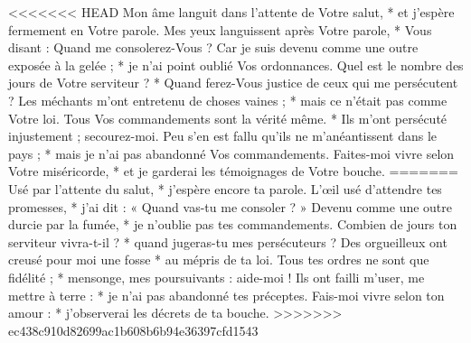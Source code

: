 <<<<<<< HEAD
Mon âme languit dans l'attente de Votre salut, * et j'espère fermement en Votre parole.
\versseparator
Mes yeux languissent après Votre parole, * Vous disant : Quand me consolerez-Vous ?
\versseparator
Car je suis devenu comme une outre exposée à la gelée ; * je n'ai point oublié Vos ordonnances.
\versseparator
Quel est le nombre des jours de Votre serviteur ? * Quand ferez-Vous justice de ceux qui me persécutent ?
\versseparator
Les méchants m'ont entretenu de choses vaines ; * mais ce n'était pas comme Votre loi.
\versseparator
Tous Vos commandements sont la vérité même. * Ils m'ont persécuté injustement ; secourez-moi.
\versseparator
Peu s'en est fallu qu'ils ne m'anéantissent dans le pays ; * mais je n'ai pas abandonné Vos commandements.
\versseparator
Faites-moi vivre selon Votre miséricorde, * et je garderai les témoignages de Votre bouche.
=======
Usé par l’attente du salut, *
j’espère encore ta parole.
\versseparator
L’œil usé d’attendre tes promesses, *
j’ai dit : « Quand vas-tu me consoler ? »
\versseparator
Devenu comme une outre durcie par la fumée, *
je n’oublie pas tes commandements.
\versseparator
Combien de jours ton serviteur vivra-t-il ? *
quand jugeras-tu mes persécuteurs ?
\versseparator
Des orgueilleux ont creusé pour moi une fosse *
au mépris de ta loi.
\versseparator
Tous tes ordres ne sont que fidélité ; *
mensonge, mes poursuivants : aide-moi !
\versseparator
Ils ont failli m’user, me mettre à terre : *
je n’ai pas abandonné tes préceptes.
\versseparator
Fais-moi vivre selon ton amour : *
j’observerai les décrets de ta bouche.
>>>>>>> ec438c910d82699ac1b608b6b94e36397cfd1543
